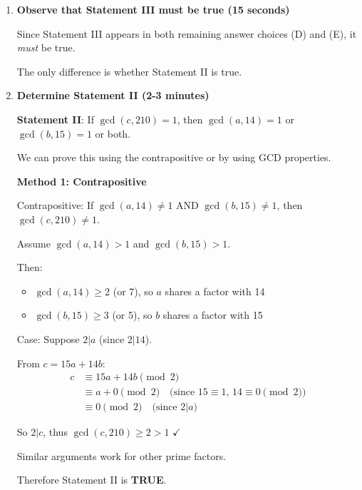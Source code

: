 \documentclass[12pt]{article}
\begin{document}
\begin{solutionbox}
\begin{enumerate}[leftmargin=*]
    Remaining choices:
    \begin{itemize}
        \item (D) III only
        \item (E) II and III only
    \end{itemize}
    
    \item \textbf{Observe that Statement III must be true (15 seconds)}
    
    Since Statement III appears in both remaining answer choices (D) and (E), it \emph{must} be true.
    
    The only difference is whether Statement II is true.
    
    \item \textbf{Determine Statement II (2-3 minutes)}
    
    \textbf{Statement II}: If $\gcd(c,210)=1$, then $\gcd(a,14)=1$ or $\gcd(b,15)=1$ or both.
    
    We can prove this using the contrapositive or by using GCD properties.
    
    \textbf{Method 1: Contrapositive}
    
    Contrapositive: If $\gcd(a,14) \neq 1$ AND $\gcd(b,15) \neq 1$, then $\gcd(c,210) \neq 1$.
    
    Assume $\gcd(a,14) > 1$ and $\gcd(b,15) > 1$.
    
    Then:
    \begin{itemize}
        \item $\gcd(a,14) \geq 2$ (or 7), so $a$ shares a factor with 14
        \item $\gcd(b,15) \geq 3$ (or 5), so $b$ shares a factor with 15
    \end{itemize}
    
    Case: Suppose $2|a$ (since $2|14$).
    
    From $c = 15a + 14b$:
    \begin{align*}
        c &\equiv 15a + 14b \pmod{2}\\
        &\equiv a + 0 \pmod{2} \quad \text{(since $15 \equiv 1$, $14 \equiv 0 \pmod{2}$)}\\
        &\equiv 0 \pmod{2} \quad \text{(since $2|a$)}
    \end{align*}
    
    So $2|c$, thus $\gcd(c,210) \geq 2 > 1$ $\checkmark$
    
    Similar arguments work for other prime factors.
    
    Therefore Statement II is \textbf{TRUE}.
    

\end{enumerate}
\end{solutionbox}
\end{document}
